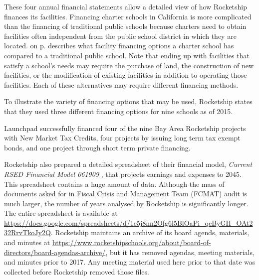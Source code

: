 These four annual financial statements allow a detailed view of how Rocketship finances its facilities. Financing charter schools in California is more complicated than the financing of traditional public schools because charters need to obtain facilities often independent from the public school district in which they are located.
 on p.\pageref{tab:charter-school-financing} describes what facility financing options a charter school has compared to a traditional public school. Note that ending up with facilities that satisfy a school's needs may require the purchase of land, the construction of new facilities, or the modification of existing facilities in addition to operating those facilities. Each of these alternatives may require different financing methods.

To illustrate the variety of financing options that may be used, Rocketship states that they used three different financing options for nine schools as of 2015.
\begin{displayquote}
Launchpad successfully financed four of the nine Bay Area Rocketship projects with New Market Tax Credits, four projects by issuing long term tax exempt bonds, and one project through short term private financing.
\end{displayquote}

Rocketship also prepared a detailed spreadsheet of their financial model, \textit{Current RSED Financial Model 061909} \parencite{RSED2009a}, that projects earnings and expenses to 2045. This spreadsheet contains a huge amount of data. Although the mass of documents asked for in Fiscal Crisis and Management Team (FCMAT) audit is much larger, the number of years analysed by Rocketship is significantly longer. The entire spreadsheet is available at \url{https://docs.google.com/spreadsheets/d/1e5j8nn2Ofg6l5BlOaPi_qcByGH_OAt232RrvTkoJy2Q}. Rocketship maintains an archive of its board agends, materials, and minutes at \url{https://www.rocketshipschools.org/about/board-of-directors/board-agendas-archive/}, but it has removed agendas, meeting materials, and minutes prior to 2017. Any meeting material used here prior to that date was collected before Rocketship removed those files.

